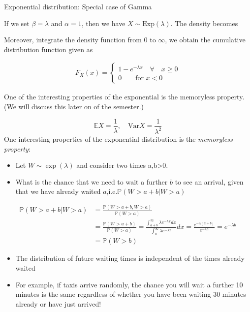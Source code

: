\documentclass[ignorenonframetext,]{beamer}
\begin{document}
\begin{frame}{Exponential distribution: Special case of Gamma}

If we set \(\beta=\lambda\) and \(\alpha=1\), then we have
\(X\sim\text{Exp}(\lambda)\). The density becomes

Moreover, integrate the density function from \(0\) to \(\infty\), we
obtain the cumulative distribution function given as

\begin{align*}F_X(x)=\begin{cases} 1-e^{-\lambda x}\quad\forall\quad x\ge 0\\ 0\qquad\text{for}\,\,x< 0 \end{cases}
\end{align*}

One of the interesting properties of the exponential is the memoryless
property. (We will discuss this later on of the semester.)

\[\mathbb{E}X=\frac{1}{\lambda},\quad\text{Var}X=\frac{1}{\lambda^2}\]
One interesting properties of the exponential distribution is the
\emph{memoryless property}:

\begin{itemize}
\item
  Let \(W\sim \exp(\lambda)\) and consider two times a,b\textgreater{}0.
\item
  What is the chance that we need to wait a further \(b\) to see an
  arrival, given that we have already waited
  \(a\),i.e.\(\mathbb{P}(W>a+b|W>a)\)
\end{itemize}

\begin{align}
\mathbb{P}(W>a+b|W>a)&=\frac{\mathbb{P}(W>a+b,W>a)}{\mathbb{P}(W>a)}\\
&=\frac{\mathbb{P}(W>a+b)}{\mathbb{P}(W>a)}=\frac{\int^{\infty}_{a+b}\lambda e^{-\lambda x}dx}{\int^{\infty}_{a}\lambda e^{-\lambda x}}dx=\frac{e^{-\lambda(a+b)}}{e^{-\lambda a}}=e^{-\lambda b}\\&=\mathbb{P}(W>b)
\end{align}

\begin{itemize}
\item
  The distribution of future waiting times is independent of the times
  already waited
\item
  For example, if taxis arrive randomly, the chance you will wait a
  further 10 minutes is the same regardless of whether you have been
  waiting 30 minutes already or have just arrived!
\end{itemize}


\end{frame}
\end{document}
